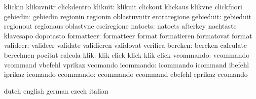                            klickin                   klikuvnitr
                           clickdentro
                  klikuit: klikuit                   clickout
                           klickaus                  klikvne
                           clickfuori
                 gebiedin: gebiedin                  regionin
                           regionin                  oblastuvnitr
                           entraregione
                gebieduit: gebieduit                 regionout
                           regionaus                 oblastvne
                           esciregione
                  natoets: natoets                   afterkey
                           nachtaste                 klavesapo
                           dopotasto
               formatteer: formatteer                format
                           formatieren               formatovat
                           format                    %
                 valideer: valideer                  validate
                           validieren                validovat
                           verifica
                  bereken: bereken                   calculate
                           berechnen                 pocitat
                           calcola
                     klik: klik                      click
                           klick                     klik
                           click
                vcommando: vcommando                 vcommand
                           vbefehl                   vprikaz
                           vcomando
                icommando: icommando                 icommand
                           ibefehl                   iprikaz
                           icomando
                ccommando: ccommando                 ccommand
                           cbefehl                   cprikaz
                           ccomando

\stopconstants




\startvariables            dutch                     english
                           german                    czech
                           italian

